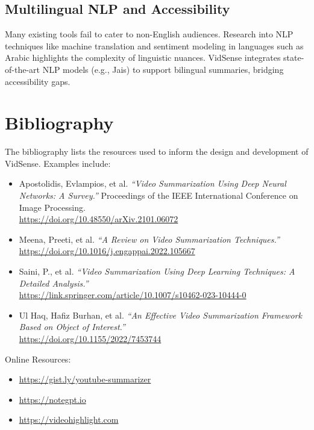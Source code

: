 \documentclass{bscs}
\begin{document}
\section{Multilingual NLP and Accessibility}
Many existing tools fail to cater to non-English audiences. Research into NLP techniques like machine translation and sentiment modeling in languages such as Arabic highlights the complexity of linguistic nuances. VidSense integrates state-of-the-art NLP models (e.g., Jais) to support bilingual summaries, bridging accessibility gaps.



\chapter{Bibliography}

The bibliography lists the resources used to inform the design and development of VidSense. Examples include:

\begin{itemize}
    \item Apostolidis, Evlampios, et al. \textit{“Video Summarization Using Deep Neural Networks: A Survey.”} Proceedings of the IEEE International Conference on Image Processing. \\ \url{https://doi.org/10.48550/arXiv.2101.06072}
    \item Meena, Preeti, et al. \textit{“A Review on Video Summarization Techniques.”} \\ \url{https://doi.org/10.1016/j.engappai.2022.105667}
    \item Saini, P., et al. \textit{“Video Summarization Using Deep Learning Techniques: A Detailed Analysis.”} \\ \url{https://link.springer.com/article/10.1007/s10462-023-10444-0}
    \item Ul Haq, Hafiz Burhan, et al. \textit{“An Effective Video Summarization Framework Based on Object of Interest.”} \\ \url{https://doi.org/10.1155/2022/7453744}
\end{itemize}

Online Resources:
\begin{itemize}
    \item \url{https://gist.ly/youtube-summarizer}
    \item \url{https://notegpt.io}
    \item \url{https://videohighlight.com}
\end{itemize}
\end{document}
